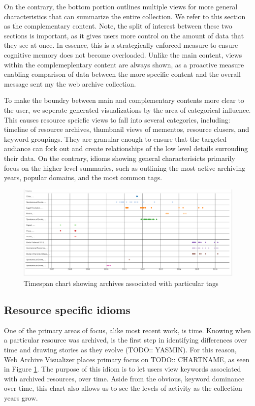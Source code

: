 \documentclass[10pt,journal,compsoc]{IEEEtran}
\begin{document}
On the contrary, the bottom portion outlines multiple views for more general characteristics that can summarize the entire collection. We refer to this section as the complementary content. Note, the split of interest between these two sections is important, as it gives users more control on the amount of data that they see at once. In essence, this is a strategically enforced measure to ensure cognitive memory does not become overloaded. Unlike the main content, views within the complemeplentary content are always shown, as a proactive measure enabling comparison of data between the more specific content and the overall message sent my the web archive collection. \par

To make the boundry between main and complementary contents more clear to the user, we seperate generated visualizations by the area of categorical influence. This causes resource speicfic views to fall into several categories, including: timeline of resource archives, thumbnail views of mementos, resource clusers, and keyword groupings. They are granular enough to ensure that the targeted audiance can fork out and create relationships of the low level details surrouding their data. On the contrary, idioms showing general characterisicts primarily focus on the higher level summaries, such as outlining the most active archiving years, popular domains, and the most common tags. \par 

\begin{figure}
\centering
\includegraphics[width=\textwidth]{Figure4}
\caption{Timespan chart showing archives associated with particular tags}
\label{fig:mesh3}
\end{figure}

\subsection{Resource specific idioms}
One of the primary areas of focus, alike most recent work, is time. Knowing when a particular resource was archived, is the first step in identifying differences over time and drawing stories as they evolve (TODO:: YASMIN). For this reason, Web Archive Visualizer places primary focus on TODO:: CHARTNAME, as seen in Figure \ref{fig:mesh3}. The purpose of this idiom is to let users view keywords associated with archived resources, over time. Aside from the obvious, keyword dominance over time, this chart also allows us to see the levels of activity as the collection years grow.
\end{document}
